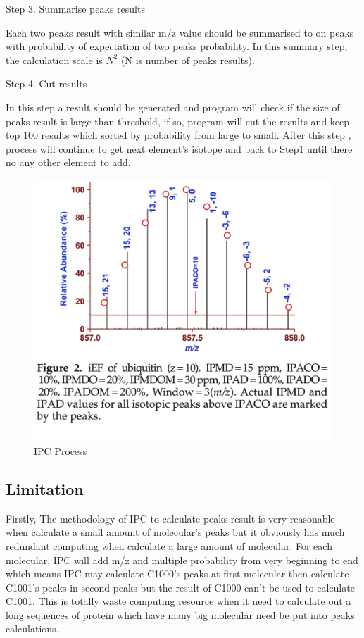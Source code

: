 \documentclass[letterpaper,twocolumn,10pt]{article}
\begin{document}
Step 3. Summarise peaks results

Each two peaks result with similar m/z value should be summarised to on peaks with probability of expectation of two peaks probability. In this summary step, the calculation scale is $N^2$ (N is number of peaks results).

Step 4. Cut results

In this step a result should be generated and program will  check if the size of peaks result is large than threshold, if so, program will cut the results and keep top 100 results which sorted by probability from large to small. After this step , process will continue to get next element's isotope and back to Step1 until there no any other element to add.

\begin{figure}[h!]
\centering
\includegraphics[scale=0.35]{protein01}
\caption{IPC Process}
\label{threadsVsSync}
\end{figure}


\subsection{Limitation}

Firstly, The methodology of IPC to calculate peaks result is very reasonable when calculate a small amount of molecular's peaks but it obviously has much redundant computing when calculate a large amount of molecular.  For each molecular, IPC will add m/z and multiple probability from very beginning to end which means IPC may calculate C1000's peaks at first molecular then calculate C1001's peaks in second peaks but the result of C1000 can't be used to calculate C1001. This is totally waste computing resource when it need to calculate out a long sequences of protein which have many big molecular need be put into peaks calculations. 
\end{document}
